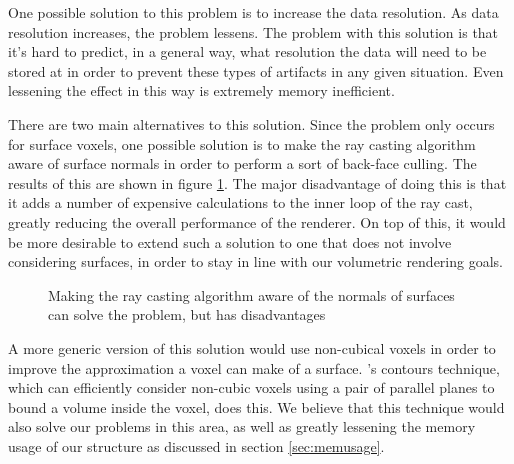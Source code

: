 One possible solution to this problem is to increase the data resolution. As data resolution increases, the problem lessens. The problem with this solution is that it's hard to predict, in a general way, what resolution the data will need to be stored at in order to prevent these types of artifacts in any given situation. Even lessening the effect in this way is extremely memory inefficient.

There are two main alternatives to this solution. Since the problem only occurs for surface voxels, one possible solution is to make the ray casting algorithm aware of surface normals in order to perform a sort of back-face culling. The results of this are shown in figure \ref{fig:fixed-reflection}. The major disadvantage of doing this is that it adds a number of expensive calculations to the inner loop of the ray cast, greatly reducing the overall performance of the renderer. On top of this, it would be more desirable to extend such a solution to one that does not involve considering surfaces, in order to stay in line with our volumetric rendering goals.

\begin{figure}
	\centering

	\caption{Making the ray casting algorithm aware of the normals of surfaces can solve the problem, but has disadvantages}
	\label{fig:fixed-reflection}
\end{figure}

A more generic version of this solution would use non-cubical voxels in order to improve the approximation a voxel can make of a surface. \citeauthor{laine10efficientsvos}'s contours technique, which can efficiently consider non-cubic voxels using a pair of parallel planes to bound a volume inside the voxel, does this. We believe that this technique would also solve our problems in this area, as well as greatly lessening the memory usage of our structure as discussed in section \ref{sec:memusage}.